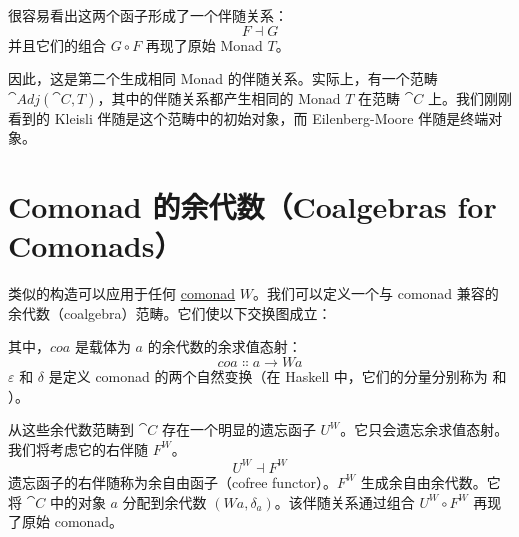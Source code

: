 很容易看出这两个函子形成了一个伴随关系：
\[F \dashv G\]
并且它们的组合 $G \circ F$ 再现了原始 Monad $T$。

因此，这是第二个生成相同 Monad 的伴随关系。实际上，有一个范畴 $\cat{Adj}(\cat{C}, T)$，其中的伴随关系都产生相同的 Monad $T$ 在范畴 $\cat{C}$ 上。我们刚刚看到的 Kleisli 伴随是这个范畴中的初始对象，而 Eilenberg-Moore 伴随是终端对象。

\section{Comonad 的余代数（Coalgebras for Comonads）}

类似的构造可以应用于任何 \hyperref[comonads]{comonad} $W$。我们可以定义一个与 comonad 兼容的余代数（coalgebra）范畴。它们使以下交换图成立：

\begin{figure}[H]
  \centering
  \begin{subfigure}
    \centering
  \end{subfigure}%
  \hspace{1cm}
  \begin{subfigure}
    \centering
  \end{subfigure}
\end{figure}

\noindent
其中，$\mathit{coa}$ 是载体为 $a$ 的余代数的余求值态射：
\[\mathit{coa} \Colon a \to W a\]
$\varepsilon$ 和 $\delta$ 是定义 comonad 的两个自然变换（在 Haskell 中，它们的分量分别称为  和 ）。

从这些余代数范畴到 $\cat{C}$ 存在一个明显的遗忘函子 $U^W$。它只会遗忘余求值态射。我们将考虑它的右伴随 $F^W$。
\[U^W \dashv F^W\]
遗忘函子的右伴随称为余自由函子（cofree functor）。$F^W$ 生成余自由余代数。它将 $\cat{C}$ 中的对象 $a$ 分配到余代数 $(W a, \delta_a)$。该伴随关系通过组合 $U^W \circ F^W$ 再现了原始 comonad。

